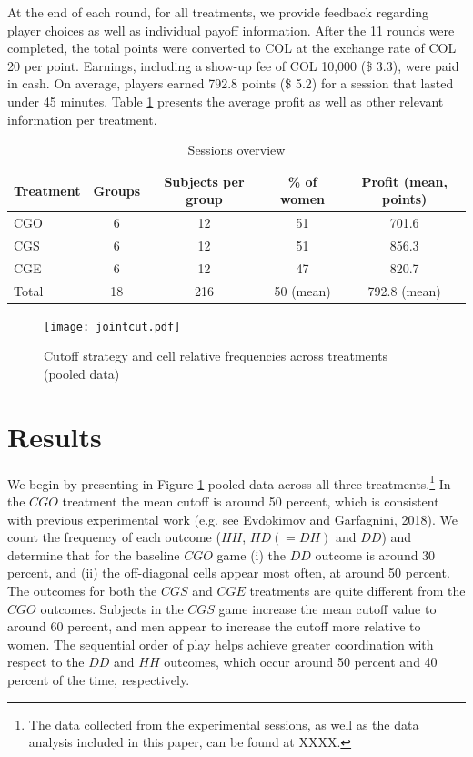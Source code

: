 \documentclass[11pt,english]{article}
\begin{document}
At the end of each round, for all treatments, we provide feedback regarding player choices as well as individual payoff information. After the 11 rounds were completed, the total points were converted to COL at the exchange rate of COL 20 per point. Earnings, including a show-up fee of COL 10,000 (\$ 3.3), were paid in cash. On average, players earned 792.8 points (\$ 5.2) for a session that lasted under 45 minutes. Table \ref{session} presents the average profit as well as other relevant information per treatment. 

\begin{table}[ht]
\centering
\caption{Sessions overview }
\hline
\begin{tabular}{lcccc}
  Treatment & Groups & Subjects per group & \% of women & Profit (mean, points)\\
  \hline  
  CGO & 6 & 12 & 51 & 701.6 \\
  CGS & 6 & 12 & 51 & 856.3 \\
  CGE & 6 & 12 & 47 & 820.7 \\
\hline
Total & 18 & 216 &  50 (mean) & 792.8 (mean)\\
\end{tabular}

\label{session}
\end{table}

\begin{center}
\begin{figure}[ht]
\centering{}%
\texttt{[image: jointcut.pdf]}%
\caption{Cutoff strategy and cell relative frequencies across treatments (pooled data)} 
\label{fig:cutpooled}
\end{figure}
\par\end{center}


\section{Results}
\label{sec:results}

We begin by presenting in Figure \ref{fig:cutpooled} pooled data across all three treatments.\footnote{The data collected from the experimental sessions, as well as the data analysis included in this paper, can be found at XXXX.} In the $CGO$ treatment the mean cutoff is around 50 percent, which is consistent with previous experimental work (e.g. see Evdokimov and Garfagnini, 2018). We count the frequency of each outcome ($HH$, $HD (=DH)$ and $DD$) and determine that for the baseline $CGO$ game (i) the $DD$ outcome is around 30 percent, and (ii) the off-diagonal cells appear most often, at around 50 percent. The outcomes for both the $CGS$ and $CGE$ treatments are quite different from the $CGO$ outcomes. Subjects in the $CGS$ game increase the mean cutoff value to around 60 percent, and men appear to increase the cutoff more relative to women. The sequential order of play helps achieve greater coordination with respect to the $DD$ and $HH$ outcomes, which occur around 50 percent and 40 percent of the time, respectively. 
\end{document}
